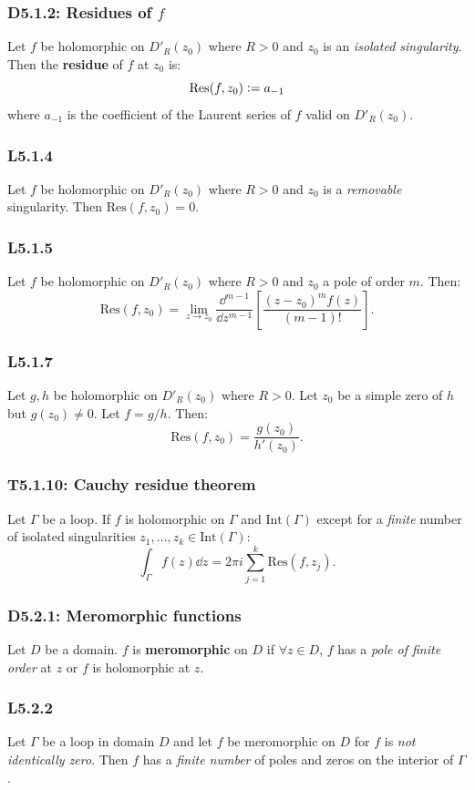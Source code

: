 \documentclass{article}
\newcommand{\deq}{\vcentcolon=}
\begin{document}
\begin{multicols*}{3}
\subsubsection*{D5.1.2: Residues of $f$}
Let $f$ be holomorphic on $D'_R(z_0)$ where $R>0$ and
$z_0$ is an \textit{isolated singularity}. Then the \textbf{residue}
of $f$ at $z_0$ is:
$$\text{Res}(f,z_0)\deq a_{-1}$$
where $a_{-1}$ is the coefficient of the Laurent series of $f$
valid on $D'_R(z_0)$.

\subsubsection*{L5.1.4}
Let $f$ be holomorphic on $D'_R(z_0)$ where $R>0$ and
$z_0$ is a \textit{removable} singularity. Then
$\text{Res}(f,z_0)=0$.

\subsubsection*{L5.1.5}
Let $f$ be holomorphic on $D'_R(z_0)$ where $R>0$ and $z_0$
a pole of order $m$. Then:
$$\text{Res}(f,z_0)=\lim_{z\rightarrow z_0}\frac{\dd^{m-1}}{\dd z^{m-1}}
\left[\frac{(z-z_0)^m f(z)}{(m-1)!}\right].$$

\subsubsection*{L5.1.7}
Let $g,h$ be holomorphic on $D'_R(z_0)$ where $R>0$.
Let $z_0$ be a simple zero of $h$ but $g(z_0)\neq0$.
Let $f=g/h$. Then:
$$\text{Res}(f,z_0)=\frac{g(z_0)}{h'(z_0)}.$$

\subsubsection*{T5.1.10: Cauchy residue theorem}
Let $\Gamma$ be a loop. If $f$ is holomorphic on
$\Gamma$ and $\text{Int}(\Gamma)$ except for a \textit{finite} number of
isolated singularities $z_1,\dots,z_k\in\text{Int}(\Gamma)$:
$$\int_{\Gamma}f(z)\dd z=2\pi i\sum_{j=1}^{k}\text{Res}(f,z_j).$$

\subsubsection*{D5.2.1: Meromorphic functions}
Let $D$ be a domain. $f$ is \textbf{meromorphic} on $D$ if $\forall z\in D$,
$f$ has a \textit{pole of finite order} at $z$ or $f$ is holomorphic at $z$.

\subsubsection*{L5.2.2}
Let $\Gamma$ be a loop in domain $D$ and let $f$ be
meromorphic on $D$ for $f$ is \textit{not identically zero}.
Then $f$ has a \textit{finite number} of poles and zeros
on the interior of $\Gamma$.


\end{multicols*}
\end{document}
